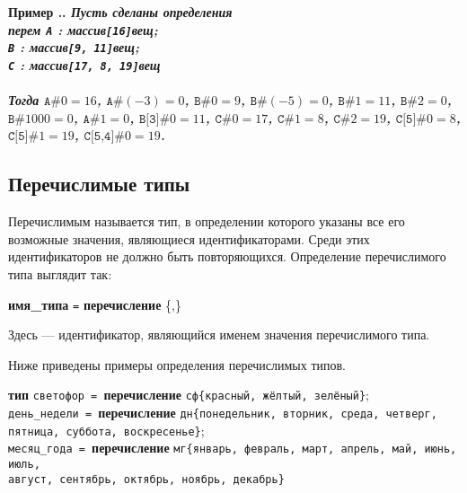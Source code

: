 \documentclass[10pt]{report}
\newcounter{exam}[section]
\renewcommand{\theexam}{\thesection.\arabic{exam}}
\newenvironment{Example}{\par\refstepcounter{exam}\bf Пример \theexam. \sl}{\rm\par}
\begin{document}
\begin{Example} \textit{Пусть сделаны определения}\\
	\rm
	\textbf{перем} \texttt{A} : \textbf{массив}\texttt{[16]}\textbf{вещ};\\
	\hspace*{11mm} \texttt{B} : \textbf{массив}\texttt{[9, 11]}\textbf{вещ};\\
	\hspace*{11mm} \texttt{C} : \textbf{массив}\texttt{[17, 8, 19]}\textbf{вещ}\\
	\\
	\textit{Тогда $\texttt{A\#}0=16$, $\texttt{A\#}(-3)=0$, $\texttt{B\#}0=9$, $\texttt{B\#}(-5)=0$, $\texttt{B\#}1=11$, $\texttt{B\#}2=0$, $\texttt{B\#}1000=0$,
		$\texttt{A\#}1=0$, $\texttt{B[3]\#}0=11$, $\texttt{C\#}0=17$, $\texttt{C\#}1=8$, $\texttt{C\#}2=19$, $\texttt{C[5]\#}0=8$, $\texttt{C[5]\#}1=19$, $\texttt{C[5,4]\#}0=19$.}
\end{Example}


\subsection{Перечислимые типы}
Перечислимым называется тип, в определении которого указаны все его возможные значения, являющиеся идентификаторами. Среди этих идентификаторов не должно быть повторяющихся. Определение перечислимого типа выглядит так:
\begin{center}
	\textbf{имя_типа} \texttt{=} \textbf{перечисление} \{\rbo,\rbc\kleene\}
\end{center}

Здесь  --- идентификатор, являющийся именем значения перечислимого типа.

Ниже приведены примеры определения перечислимых типов.

\noindent\textbf{тип} \texttt{светофор = }\textbf{перечисление} \texttt{сф}\texttt{\{красный, жёлтый, зелёный\}};\\
\hspace*{7.5mm}\texttt{день_недели = }\textbf{перечисление} \texttt{дн}\texttt{\{понедельник, вторник, среда, четверг,}\\
\hspace*{65mm}\texttt{пятница, суббота, воскресенье\}};\\
\hspace*{7.5mm}\texttt{месяц_года = }\textbf{перечисление} \texttt{мг}\texttt{\{январь, февраль, март, апрель, май, июнь, июль,}\\
\hspace*{63mm}\texttt{август, сентябрь, октябрь, ноябрь, декабрь\}} 
\end{document}

